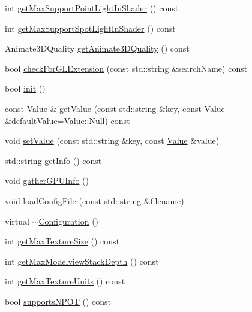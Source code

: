 \begin{DoxyCompactItemize}
\item 
int \hyperlink{classConfiguration_ab26f93b21e2d51d7b343068b15252f1b}{get\+Max\+Support\+Point\+Light\+In\+Shader} () const
\item 
int \hyperlink{classConfiguration_a103e36372191a3a0046728d3e8476601}{get\+Max\+Support\+Spot\+Light\+In\+Shader} () const
\item 
Animate3\+D\+Quality \hyperlink{classConfiguration_aa7340d160089d9f6de0ebc916740c3c1}{get\+Animate3\+D\+Quality} () const
\item 
bool \hyperlink{classConfiguration_a09fd5d87edb45d08c701e048d5ff30f9}{check\+For\+G\+L\+Extension} (const std\+::string \&search\+Name) const
\item 
bool \hyperlink{classConfiguration_a4eac7383dc99601820516eef2d1dce85}{init} ()
\item 
const \hyperlink{classValue}{Value} \& \hyperlink{classConfiguration_ab8b89fab93a9c31798863a720d7ce290}{get\+Value} (const std\+::string \&key, const \hyperlink{classValue}{Value} \&default\+Value=\hyperlink{classValue_af01b27b1c6ca5f4577a4b6c10a186f59}{Value\+::\+Null}) const
\item 
void \hyperlink{classConfiguration_a33af625654620b5fe9fe0f644278424c}{set\+Value} (const std\+::string \&key, const \hyperlink{classValue}{Value} \&value)
\item 
std\+::string \hyperlink{classConfiguration_ab87bc1959c25c1e1f1887561f52aa0f7}{get\+Info} () const
\item 
void \hyperlink{classConfiguration_a708084005c949e65fe4ce442081cf89e}{gather\+G\+P\+U\+Info} ()
\item 
void \hyperlink{classConfiguration_a1204d5d346ef086d437babc75677293d}{load\+Config\+File} (const std\+::string \&filename)
\item 
virtual \hyperlink{classConfiguration_a1226f87dc3c27be16eb16e53301eb2f3}{$\sim$\+Configuration} ()
\item 
int \hyperlink{classConfiguration_ab57f9e083afc5471f8af07f7d202135b}{get\+Max\+Texture\+Size} () const
\item 
int \hyperlink{classConfiguration_a0d3b6fb664b2b48b5090f113a34bfd11}{get\+Max\+Modelview\+Stack\+Depth} () const
\item 
int \hyperlink{classConfiguration_ab6b3b10e44ce28029bb9c157a339a91f}{get\+Max\+Texture\+Units} () const
\item 
bool \hyperlink{classConfiguration_a48e53be56a6224f95193a36cd1a5e676}{supports\+N\+P\+OT} () const
\item 

\end{DoxyCompactItemize}
